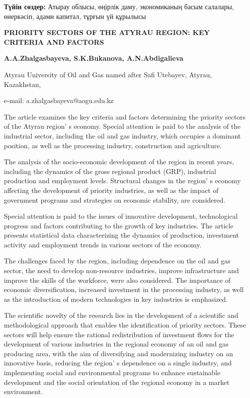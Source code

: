 {\bfseries Түйін сөздер:} Атырау облысы, өңірлік даму, экономиканың басым
салалары, өнеркәсіп, адами капитал, тұрғын үй құрылысы
\newpage
\begin{articleheader}
{\bfseries PRIORITY SECTORS OF THE ATYRAU REGION: KEY CRITERIA AND FACTORS}

{\bfseries
A.A.Zhalgasbayeva\textsuperscript{\envelope },
S.K.Bukanova,
A.N.Abdigalieva
}
\end{articleheader}

\begin{affiliation}
Atyrau University of Oil and Gas named after Safi Utebayev, Atyrau, Kazakhstan,

e-mail: a.zhalgasbayeva@aogu.edu.kz
\end{affiliation}

The article examines the key criteria and factors determining the
priority sectors of the Atyrau region' s economy. Special
attention is paid to the analysis of the industrial sector, including
the oil and gas industry, which occupies a dominant position, as well as
the processing industry, construction and agriculture.

The analysis of the socio-economic development of the region in recent
years, including the dynamics of the gross regional product (GRP),
industrial production and employment levels. Structural changes in the
region' s economy affecting the development of priority
industries, as well as the impact of government programs and strategies
on economic stability, are considered.

Special attention is paid to the issues of innovative development,
technological progress and factors contributing to the growth of key
industries. The article presents statistical data characterizing the
dynamics of production, investment activity and employment trends in
various sectors of the economy.

The challenges faced by the region, including dependence on the oil and
gas sector, the need to develop non-resource industries, improve
infrastructure and improve the skills of the workforce, were also
considered. The importance of economic diversification, increased
investment in the processing industry, as well as the introduction of
modern technologies in key industries is emphasized.

The scientific novelty of the research lies in the development of a
scientific and methodological approach that enables the identification
of priority sectors. These sectors will help ensure the rational
redistribution of investment flows for the development of various
industries in the regional economy of an oil and gas producing area,
with the aim of diversifying and modernizing industry on an innovative
basis, reducing the region' s dependence on a single
industry, and implementing social and environmental programs to enhance
sustainable development and the social orientation of the regional
economy in a market environment.

